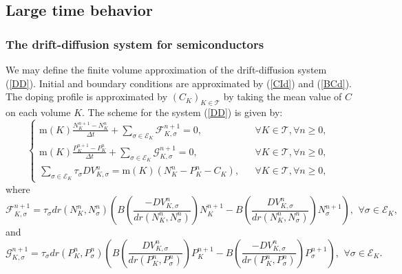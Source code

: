 \documentclass[smallextended]{svjour3}
\newcommand{\ds}{\displaystyle}
\begin{document}
 

\subsection{Large time behavior}


\subsubsection{The drift-diffusion system for semiconductors}

We may define the finite volume approximation of the drift-diffusion system (\ref{DD}). Initial and boundary conditions are approximated by (\ref{CId}) and (\ref{BCd}). The doping profile is approximated by $(C_{K})_{K \in \mathcal{T}}$ by taking the mean value of $C$ on each volume $K$. The scheme for the system (\ref{DD}) is given by:
\begin{equation*}
\left\{\begin{array}{lcl}\text{m}(K)\ds{\frac{N^{n+1}_{K}-N^{n}_{K}}{\Delta t}}+\sum_{\sigma \in \mathcal{E}_{K}} \mathcal{F}_{K,\sigma}^{n+1}=0, & & \forall K \in \mathcal{T}, \forall n \geq 0,\\ 
\text{m}(K)\ds{\frac{P^{n+1}_{K}-P^{n}_{K}}{\Delta t}}+\sum_{\sigma \in \mathcal{E}_{K}} \mathcal{G}_{K,\sigma}^{n+1}=0, & & \forall K \in \mathcal{T}, \forall n \geq 0,\\ 
\sum_{\sigma \in \mathcal{E}_{K}}\tau_{\sigma}DV_{K,\sigma}^{n}=\text{m}(K)\left(N_{K}^{n}-P_{K}^{n}-C_{K}\right), & & \forall K \in \mathcal{T}, \forall n \geq 0, \end{array}\right.
\end{equation*}
where 
\begin{equation*}
\mathcal{F}_{K,\sigma}^{n+1}= \tau_{\sigma} dr\left(N_{K}^{n},N_{\sigma}^{n}\right) \left(B\left(\ds{\frac{-DV_{K,\sigma}^{n}}{dr\left(N_{K}^{n},N_{\sigma}^{n}\right)}}\right)N_{K}^{n+1}-B\left(\ds{\frac{DV_{K,\sigma}^{n}}{dr(N_{K}^{n},N_{\sigma}^{n})}}\right)N_{\sigma}^{n+1}\right), \,\ \forall \sigma \in \mathcal{E}_{K},
\end{equation*}
and
\begin{equation*}
\mathcal{G}_{K,\sigma}^{n+1}= \tau_{\sigma} dr(P_{K}^{n},P_{\sigma}^{n}) \left(B\left(\ds{\frac{DV_{K,\sigma}^{n}}{dr(P_{K}^{n},P_{\sigma}^{n})}}\right)P_{K}^{n+1}-B\left(\ds{\frac{-DV_{K,\sigma}^{n}}{dr(P_{K}^{n},P_{\sigma}^{n})}}\right)P_{\sigma}^{n+1}\right), \,\ \forall \sigma \in \mathcal{E}_{K}.
\end{equation*}
\end{document}
